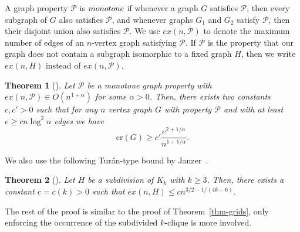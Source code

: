\documentclass{article}
\newtheorem{theorem}{Theorem}
\begin{document}
A graph property $\mathcal{P}$ is $\emph{monotone}$ if whenever a graph $G$ satisfies $\mathcal{P}$, then every subgraph of $G$ also satisfies $\mathcal{P}$, and whenever graphs $G_1$ and $G_2$ satisfy $\mathcal{P}$, then their disjoint union also satisfies $\mathcal{P}$.
We use $ex(n,\mathcal{P})$ to denote the maximum number of edges of an $n$-vertex graph satisfying $\mathcal{P}$.
If $\mathcal{P}$ is the property that our graph does not contain a subgraph isomorphic to a fixed graph $H$, then we write $ex(n,H)$ instead of $ex(n,\mathcal{P})$.

\begin{theorem}[\cite{pachspencertoth}]
\label{thm:crossing_general}
Let $\mathcal{P}$ be a monotone graph property with $ex(n,\mathcal{P}) \in O(n^{1+\alpha})$ for some $\alpha>0$. 
Then, there exists two constants $c,c'>0$ such that for any $n$ vertex graph $G$ with property $\mathcal{P}$ and with at least $e\geq cn\log^2 n$ edges we have
\[\textrm{cr}(G)\geq c'\frac{e^{2+1/\alpha}}{n^{1+1/\alpha}}.\]
\end{theorem}

We also use the following Tur\'{a}n-type bound by Janzer~\cite{janzer19}.

\begin{theorem}[\cite{janzer19}]
\label{thm-TuranMaxDegree}
Let $H$ be a subdivision of $K_k$ with $k \geq 3$.
Then, there exists a constant $c = c(k) > 0$ such that $ex(n, H) \leq cn^{3/2 - 1/(4k-6)}$.
\end{theorem}

The rest of the proof is similar to the proof of Theorem~\ref{thm-grids}, only enforcing the occurrence of the subdivided $k$-clique is more involved.
\end{document}
